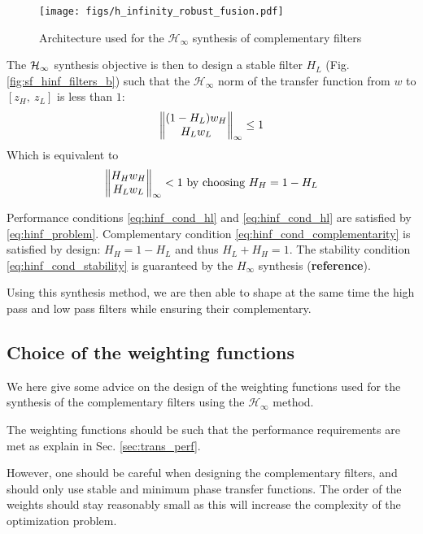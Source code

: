 \documentclass[9pt, technote, a4paper]{ieeeconf}
\begin{document}
\begin{figure}[htbp]
\centering
\texttt{[image: figs/h\_infinity\_robust\_fusion.pdf]}
\caption{\label{fig:h_infinity_robust_fusion}
Architecture used for the \(\mathcal{H}_\infty\) synthesis of complementary filters}
\end{figure}

The \(\mathcal{H}_\infty\) synthesis objective is then to design a stable filter \(H_L\) (Fig. \ref{fig:sf_hinf_filters_b}) such that the \(\mathcal{H}_\infty\) norm of the transfer function from \(w\) to \([z_H, \ z_L]\) is less than \(1\):
\begin{equation}
  \left\|\begin{matrix} (1 - H_L) w_H \\ H_L w_L \end{matrix}\right\|_{\infty} \le 1
\end{equation}
Which is equivalent to
\begin{equation}
\label{eq:hinf_problem}
  \left\|\begin{matrix} H_H w_H \\ H_L w_L \end{matrix}\right\|_{\infty} < 1 \text{ by choosing } H_H = 1 - H_L
\end{equation}

Performance conditions \eqref{eq:hinf_cond_hl} and \eqref{eq:hinf_cond_hl} are satisfied by \eqref{eq:hinf_problem}.
Complementary condition \eqref{eq:hinf_cond_complementarity} is satisfied by design: \(H_H = 1 - H_L\) and thus \(H_L + H_H = 1\).
The stability condition \eqref{eq:hinf_cond_stability} is guaranteed by the \(H_\infty\) synthesis (\textbf{reference}).


Using this synthesis method, we are then able to shape at the same time the high pass and low pass filters while ensuring their complementary.

\subsection{Choice of the weighting functions}
\label{sec:org3997457}
\label{sec:hinf_weighting_func}

We here give some advice on the design of the weighting functions used for the synthesis of the complementary filters using the \(\mathcal{H}_\infty\) method.

The weighting functions should be such that the performance requirements are met as explain in Sec. \ref{sec:trans_perf}.

However, one should be careful when designing the complementary filters, and should only use stable and minimum phase transfer functions.
The order of the weights should stay reasonably small as this will increase the complexity of the optimization problem.
\end{document}
